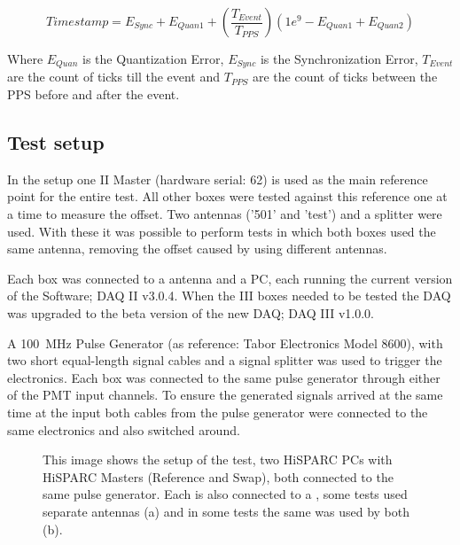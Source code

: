 \begin{equation}
    Timestamp = E_{Sync} + E_{Quan1} + \left(\frac{T_{Event}}{T_{PPS}}\right)
                 \left(1e^9 - E_{Quan1} + E_{Quan2}\right)
\end{equation}

Where $E_{Quan}$ is the Quantization Error, $E_{Sync}$ is the
Synchronization Error, $T_{Event}$ are the count of ticks till the event
and $T_{PPS}$ are the count of ticks between the PPS before and after
the event.



\subsection{Test setup}
\label{sub:gps_test_setup}

In the setup one \hisparc II Master (hardware serial: 62) is used as the
main reference point for the entire test. All other \hisparc boxes were
tested against this reference one at a time to measure the offset. Two
\gps antennas ('501' and 'test') and a \gps splitter were used. With
these it was possible to perform tests in which both \hisparc boxes used
the same \gps antenna, removing the offset caused by using different
\gps antennas.

Each \hisparc box was connected to a \gps antenna and a PC, each running
the current version of the \hisparc Software; \hisparc DAQ II v3.0.4.
When the \hisparc III boxes needed to be tested the DAQ was upgraded to
the beta version of the new DAQ; \hisparc DAQ III v1.0.0.

A \SI{100}{\mega\hertz} Pulse Generator (as reference: Tabor Electronics
Model 8600), with two short equal-length signal cables and a signal
splitter was used to trigger the \hisparc electronics. Each box was
connected to the same pulse generator through either of the PMT input
channels. To ensure the generated signals arrived at the same time at
the input both cables from the pulse generator were connected to the
same \hisparc electronics and also switched around.

\begin{figure}
    \centering
    
    \caption{This image shows the setup of the test, two HiSPARC PCs
             with HiSPARC Masters (Reference and Swap), both connected
             to the same pulse generator. Each is also connected to a
             \gps, some tests used separate \gps antennas (a) and in
             some tests the same \gps was used by both (b).}
    \label{fig:setup}
\end{figure}


